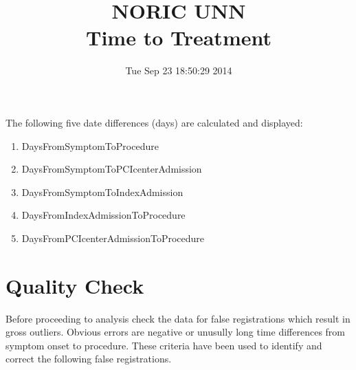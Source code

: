 \documentclass[presentation,xcolor=pdftex,dvipsnames,table,11pt]{beamer}
\title{NORIC UNN \\Time to Treatment}\date{ Tue Sep 23 18:50:29 2014 }
\begin{document}
\begin{tiny}

\maketitle





\begin{frame}
The following five date differences (days) are calculated and displayed:
\begin{enumerate}
\item{DaysFromSymptomToProcedure}
\item{DaysFromSymptomToPCIcenterAdmission}
\item{DaysFromSymptomToIndexAdmission}
\item{DaysFromIndexAdmissionToProcedure}
\item{DaysFromPCIcenterAdmissionToProcedure}
\end{enumerate}
\end{frame}






\section{Quality Check}

\begin{frame}
  
Before proceeding to analysis check the data for false registrations which result in gross outliers. Obvious errors are negative or unusully long time differences from symptom onset to procedure. These criteria have been used to identify and correct the following false registrations.


\end{frame}
\end{tiny}
\end{document}
